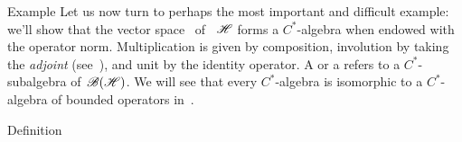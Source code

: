\documentclass[a]{subfiles}
\begin{document}
\begin{parsec}[hilb]%
\begin{point}{Example}%
Let us now turn to perhaps the most important
and difficult example:
we'll show that the vector space~\Define{$\scrB(\scrH)$} 
of ~$\mathscr{H}$ forms a $C^*$-algebra
when endowed with the operator 
norm.
Multiplication is given by composition,
involution by taking the \emph{adjoint} (see~),
and unit by the identity operator.
A  or
a  
refers to a $C^*$-subalgebra of~$\scrB(\scrH)$.
We will see that every $C^*$-algebra is isomorphic to a $C^*$-algebra
of bounded operators in~.
\end{point}
\begin{point}{Definition}%


\end{point}
\end{parsec}
\end{document}
